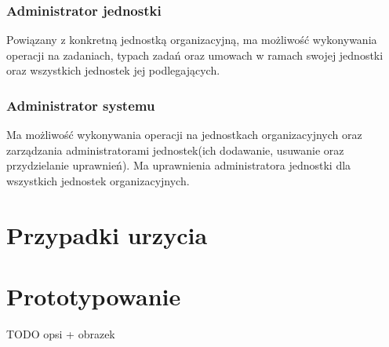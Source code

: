 \subsubsection{Administrator jednostki}
Powiązany z konkretną jednostką organizacyjną, ma możliwość wykonywania operacji na zadaniach, typach zadań oraz umowach w ramach swojej jednostki oraz wszystkich jednostek jej podlegających.

\subsubsection{Administrator systemu}
Ma możliwość wykonywania operacji na jednostkach organizacyjnych oraz zarządzania administratorami jednostek(ich dodawanie, usuwanie oraz przydzielanie uprawnień). Ma uprawnienia administratora jednostki dla wszystkich jednostek organizacyjnych.

\section[Przypadki urzycia][Przypadki urzycia]{Przypadki urzycia}


\section[Prototypowanie][Prototypowanie]{Prototypowanie}
TODO opsi + obrazek

